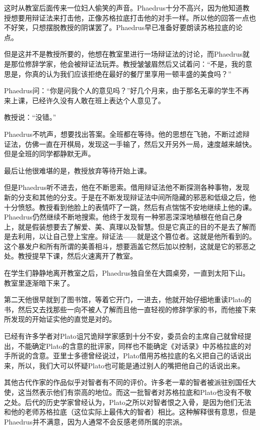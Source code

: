\documentclass[UTF8]{article}
\begin{document}
\par 这时从教室后面传来一位妇人偷笑的声音。Phaedrus十分不高兴，因为他知道教授想要用辩证法来打击他，正像苏格拉底打击他的对手一样。所以他的回答一点也不好笑，只想摆脱教授的阴谋罢了。Phaedrus早已准备好要朗读苏格拉底的论点。
\par 但是这并不是教授所要的，他想在教室里进行一场辩证法的讨论，而Phaedrus就是那位修辞学家，他会被辩证法玩弄。教授皱皱眉然后又试着问：“不是，我的意思是，你真的认为我们应该拒绝在最好的餐厅里享用一顿丰盛的美食吗？”
\par Phaedrus问：“你是问我个人的意见吗？”好几个月来，由于那名无辜的学生不再来上课，已经许久没有人敢在班上表达个人意见了。
\par 教授说：“没错。”
\par Phaedrus不吭声，想要找出答案。全班都在等待。他的思想在飞驰，不断过滤辩证法，仿佛一直在开棋局，发现这一手输了，然后又开另外一局，速度越来越快。但是全班的同学都静默无声。
\par 最后让他很难堪的是，教授放弃等待开始上课。
\par 但是Phaedrus听不进去，他在不断思索。借用辩证法他不断探测各种事物，发现新的分支和其他的分支。于是在不断发现辩证法中间所隐藏的邪恶和低级之后，他十分愤怒。教授看到他脸上的表情吓了一跳，然后有点惴惴不安地继续上他的课。Phaedrus仍然继续不断地搜索。他终于发现有一种邪恶深深地植根在他自己身上，就是假装想要去了解爱、美、真理以及智慧。但是它真正的目的不是去了解而是去利用，以让自己登上宝座。辩证法——就是这个篡位者。这就是他所看到的。这个暴发户和所有所谓的美善相斗，想要涵盖它然后加以控制，这就是它的邪恶之处。教授提早下课，然后火速离开了教室。
\par 在学生们静静地离开教室之后，Phaedrus独自坐在大圆桌旁，一直到太阳下山。教室里逐渐暗下来了。
\par 第二天他很早就到了图书馆，等着它开门，一进去，他就开始仔细地重读Plato的书，然后又去找那些一向不被人了解而且他一直轻视的修辞学家的书，而他接下来所发现的开始证实他的直觉是对的。
\par 已经有许多学者对Plato诅咒诡辩学家感到十分不安，委员会的主席自己就曾经提出，不能确定Plato的含意的批评家，同样也不能确定《对话录》中苏格拉底的对手所说的含意。亚里士多德曾经说过，Plato借用苏格拉底的名义把自己的话说出来，所以，我们大可以怀疑Plato也可能是通过别人的嘴把他自己的话说出来。
\par 其他古代作家的作品似乎对智者有不同的评价。许多老一辈的智者被派驻别国任大使，这当然表示他们有崇高的地位。而这一批智者对苏格拉底和Plato也没有不敬之处。后代的历史学家曾经认为，Plato之所以对智者恨之入骨，是因为他们无法和他的老师苏格拉底（这位实际上最伟大的智者）相比。这种解释很有意思，但是Phaedrus并不满意，因为人通常不会反感老师所属的宗派。
\end{document}
